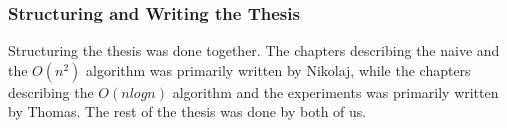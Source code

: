 \subsubsection{Structuring and Writing the Thesis}
Structuring the thesis was done together. The chapters describing the naive and the $O(n^2)$ algorithm was primarily written by Nikolaj, while the chapters describing the $O(nlogn)$ algorithm and the experiments was primarily written by Thomas. The rest of the thesis was done by both of us.




